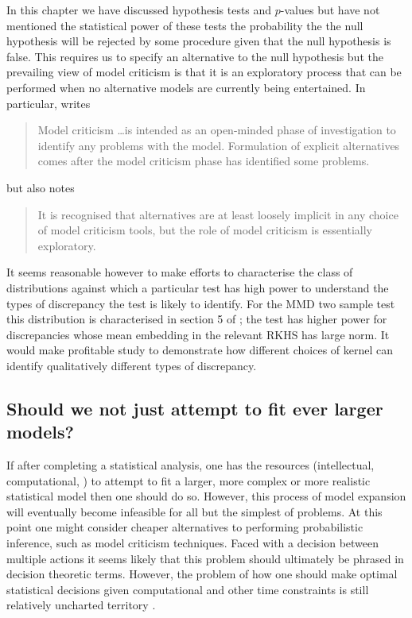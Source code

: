 In this chapter we have discussed hypothesis tests and $p$-values but have not mentioned the statistical power of these tests \ie the probability the the null hypothesis will be rejected by some procedure given that the null hypothesis is false.
This requires us to specify an alternative to the null hypothesis but the prevailing view of model criticism is that it is an exploratory process that can be performed when no alternative models are currently being entertained.
In particular, \citet{OHagan2003-bc} writes
\begin{quotation}
Model criticism \dots is intended as an open-minded phase of investigation
to identify any problems with the model. Formulation of explicit alternatives
comes after the model criticism phase has identified some problems.
\end{quotation}
but also notes
\begin{quotation}
It is recognised that alternatives are at least loosely implicit
in any choice of model criticism tools, but the role of model criticism is
essentially exploratory.
\end{quotation}
It seems reasonable however to make efforts to characterise the class of distributions against which a particular test has high power to understand the types of discrepancy the test is likely to identify.
For the MMD two sample test this distribution is characterised in section 5 of \cite{Gretton2012-ss}; the test has higher power for discrepancies whose mean embedding in the relevant RKHS has large norm.
It would make profitable study to demonstrate how different choices of kernel can identify qualitatively different types of discrepancy.

\subsection{Should we not just attempt to fit ever larger models?}

If after completing a statistical analysis, one has the resources (intellectual, computational, \etc) to attempt to fit a larger, more complex or more realistic statistical model then one should do so.
However, this process of model expansion will eventually become infeasible for all but the simplest of problems.
At this point one might consider cheaper alternatives to performing probabilistic inference, such as model criticism techniques.
Faced with a decision between multiple actions it seems likely that this problem should ultimately be phrased in decision theoretic terms.
However, the problem of how one should make optimal statistical decisions given computational and other time constraints is still relatively uncharted territory \citep{Jordan2013-uv}.

